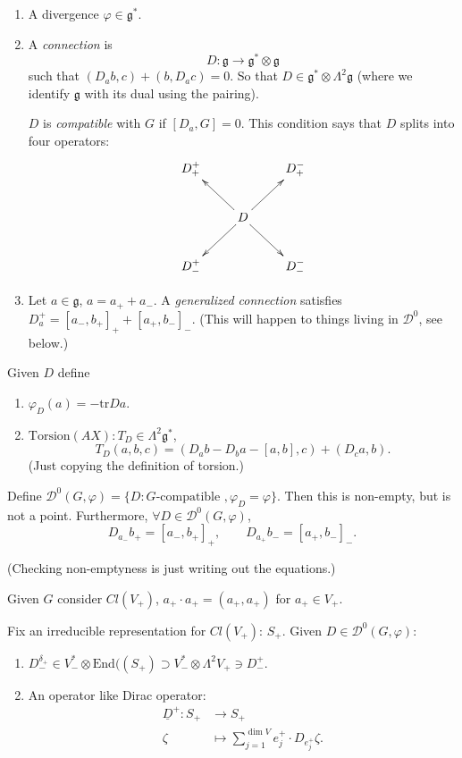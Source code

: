 {\begin{definition}
\begin{enumerate}
This gives $\mathfrak{g}=V_+ \oplus V_-$ where $G$ acts as identity on the
first term and as $-\text{Id}$ on the second one.
$(G_-,-)$ is a non-degenerate pairing.
$(-,-)_{V_I}$ non-degenerate tensor.

\item A divergence $\varphi \in \mathfrak{g} ^*$.

\item A {\it connection} is 
$$
D: \mathfrak{g} \to \mathfrak{g}^* \otimes \mathfrak{g}
$$
such that $(D_ab,c)+(b,D_ac)=0$.
So that $D \in \mathfrak{g}^*  \otimes \Lambda^{2}\mathfrak{g}$ 
(where we identify $\mathfrak{g}$ with its dual using the pairing).

$D$ is  {\it compatible} with $G$ if
$[D_a,G]=0$. This condition says that $D$ splits into four operators:
$$
\xymatrix{
D^+_+&  &  D_+^-\\
&  D\ar[ul]\ar[ur]\ar[dl]\ar[dr]\\
D^+_-& & D_-^-
}
$$
\item  Let $a \in \mathfrak{g}$, $a=a_++a_-$.
A {\it generalized connection} satisfies
$D_a^+=[a_-,b_+]_+ +[a_+,b_-]_-$. (This will happen to things
living in $\mathcal{D}^0$, see below.)
\end{enumerate}
\end{definition}

\begin{definition}
\label{definition-}
Given $D$ define
\begin{enumerate}
\item $\varphi_D(a)=-\text{tr}Da$.
\item $\text{Torsion}(AX):T_D \in \Lambda^{2}\mathfrak{g}^*$,
$$
T_D(a,b,c)=(D_ab-D_ba-[a,b],c)+(D_ca,b).
$$
(Just copying the definition of torsion.)
\end{enumerate}
\end{definition}

\begin{lemma}
\label{lemma-}
Define $\mathcal{D}^0(G,\varphi)=\{D:G\text{-compatible }, \varphi_D=\varphi\}$.
Then this is non-empty, but is not a point.
Furthermore, $\forall  D \in \mathcal{D}^0(G,\varphi)$,
$$
D_{a_-}b_+=[a_-,b_+]_+,\qquad 
D_{a_+}b_-=[a_+,b_-]_-.
$$
\end{lemma}

(Checking non-emptyness is just writing out the equations.)

\medskip\noindent
Given $G$ consider $Cl (V_+)$,
 $a_+\cdot a_+=(a_+,a_+)$ for $a_+ \in V_+$.

Fix an irreducible representation for $Cl(V_+)$: $S_+$.
Given  $D \in \mathcal{D}^0(G,\varphi)$:
\begin{enumerate}
\item $D_-^{\delta_+} \in V_-^* \otimes \text{End}((S_+)\supset
V_-^*\otimes \Lambda^{2}V_+ \ni D_-^+$.
\item An operator like Dirac operator:
\begin{align*}
\underline{D}^+: S_+ &\longrightarrow S_+ \\
\zeta &\longmapsto \sum_{j=1}^{\dim V}e_j^+\cdot D_{e_j^+}\zeta.
\end{align*}
\end{enumerate}

}
